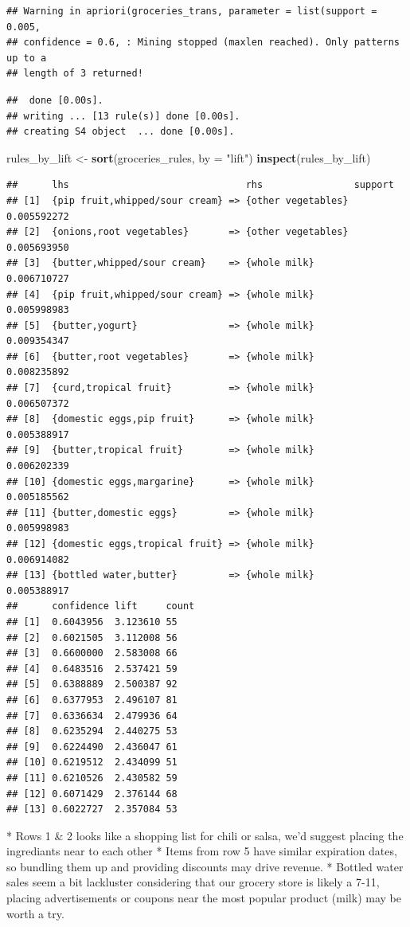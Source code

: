 \documentclass[]{article}
\newenvironment{Shaded}{\begin{snugshade}}{\end{snugshade}}
\newcommand{\DataTypeTok}[1]{\textcolor[rgb]{0.13,0.29,0.53}{#1}}
\newcommand{\KeywordTok}[1]{\textcolor[rgb]{0.13,0.29,0.53}{\textbf{#1}}}
\newcommand{\NormalTok}[1]{#1}
\newcommand{\StringTok}[1]{\textcolor[rgb]{0.31,0.60,0.02}{#1}}
\begin{document}
\begin{verbatim}
## Warning in apriori(groceries_trans, parameter = list(support = 0.005,
## confidence = 0.6, : Mining stopped (maxlen reached). Only patterns up to a
## length of 3 returned!
\end{verbatim}

\begin{verbatim}
##  done [0.00s].
## writing ... [13 rule(s)] done [0.00s].
## creating S4 object  ... done [0.00s].
\end{verbatim}

\begin{Shaded}
\begin{Highlighting}[]
\NormalTok{rules_by_lift <-}\StringTok{ }\KeywordTok{sort}\NormalTok{(groceries_rules, }\DataTypeTok{by =} \StringTok{"lift"}\NormalTok{)}
\KeywordTok{inspect}\NormalTok{(rules_by_lift)}
\end{Highlighting}
\end{Shaded}

\begin{verbatim}
##      lhs                               rhs                support    
## [1]  {pip fruit,whipped/sour cream} => {other vegetables} 0.005592272
## [2]  {onions,root vegetables}       => {other vegetables} 0.005693950
## [3]  {butter,whipped/sour cream}    => {whole milk}       0.006710727
## [4]  {pip fruit,whipped/sour cream} => {whole milk}       0.005998983
## [5]  {butter,yogurt}                => {whole milk}       0.009354347
## [6]  {butter,root vegetables}       => {whole milk}       0.008235892
## [7]  {curd,tropical fruit}          => {whole milk}       0.006507372
## [8]  {domestic eggs,pip fruit}      => {whole milk}       0.005388917
## [9]  {butter,tropical fruit}        => {whole milk}       0.006202339
## [10] {domestic eggs,margarine}      => {whole milk}       0.005185562
## [11] {butter,domestic eggs}         => {whole milk}       0.005998983
## [12] {domestic eggs,tropical fruit} => {whole milk}       0.006914082
## [13] {bottled water,butter}         => {whole milk}       0.005388917
##      confidence lift     count
## [1]  0.6043956  3.123610 55   
## [2]  0.6021505  3.112008 56   
## [3]  0.6600000  2.583008 66   
## [4]  0.6483516  2.537421 59   
## [5]  0.6388889  2.500387 92   
## [6]  0.6377953  2.496107 81   
## [7]  0.6336634  2.479936 64   
## [8]  0.6235294  2.440275 53   
## [9]  0.6224490  2.436047 61   
## [10] 0.6219512  2.434099 51   
## [11] 0.6210526  2.430582 59   
## [12] 0.6071429  2.376144 68   
## [13] 0.6022727  2.357084 53
\end{verbatim}

* Rows 1 \& 2 looks like a shopping list for chili or salsa, we'd
suggest placing the ingrediants near to each other * Items from row 5
have similar expiration dates, so bundling them up and providing
discounts may drive revenue. * Bottled water sales seem a bit lackluster
considering that our grocery store is likely a 7-11, placing
advertisements or coupons near the most popular product (milk) may be
worth a try.
\end{document}
